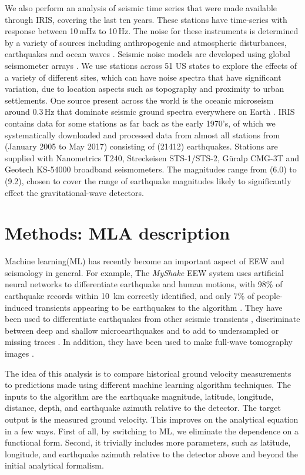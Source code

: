 \documentclass[reprint, prl, aps, showpacs]{revtex4-1}
\newcommand{\rednote}[1]{{\color{red} (#1)}}
\begin{document}
We also perform an analysis of seismic time series that were made available through IRIS, covering the last ten years. These stations have time-series with response between 10\,mHz to 10\,Hz. The noise for these instruments is determined by a variety of sources including anthropogenic and atmospheric disturbances, earthquakes and ocean waves \cite{BCB2006}. 
Seismic noise models are developed using global seismometer arrays  \cite{Pet1993,BDE2004,McEA2009}.
We use stations across 51 US states to explore the effects of a variety of different sites, which can have noise spectra that have significant variation, due to location aspects such as topography and proximity to urban settlements.
One source present across the world is the oceanic microseism around 0.3\,Hz that dominate seismic ground spectra everywhere on Earth \cite{HMS1963,ToLa1968,Ces1994,FKK1998}. IRIS contains data for some stations as far back as the early 1970's, of which we systematically downloaded and processed data from almost all stations from \rednote{January 2005 to May 2017} consisting of  \rednote{21412} earthquakes. Stations are supplied with Nanometrics T240, Streckeisen STS-1/STS-2, G\"uralp CMG-3T and Geotech KS-54000 broadband seismometers. 
The magnitudes range from \rednote{6.0} to \rednote{9.2}, chosen to cover the range of earthquake magnitudes likely to significantly effect the gravitational-wave detectors.





\section{Methods: MLA description} \label{sec:MLA}

Machine learning(ML) has recently become an important aspect of EEW and seismology in general. For example,
The \emph{MyShake} EEW system uses artificial neural networks to differentiate earthquake and human motions, with 98\% of earthquake records within 10\, km correctly identified, and only 7\% of people-induced transients appearing to be earthquakes to the algorithm  \cite{KoAl2016}.
They have been used to differentiate earthquakes from other seismic transients \cite{KuYi2011,KoUs2016,PeGh2017}, discriminate between deep and shallow microearthquakes \cite{MoHo2016} and to add to undersampled or missing traces \cite{JiMa2017}. In addition, they have been used to make full-wave tomography images \cite{DiLe2011}.

The idea of this analysis is to compare historical ground velocity measurements to predictions made using different machine learning algorithm techniques. 
The inputs to the algorithm are the earthquake magnitude, latitude, longitude, distance, depth, and earthquake azimuth relative to the detector. 
The target output is the measured ground velocity.
This improves on the analytical equation in a few ways.
First of all, by switching to ML, we eliminate the dependence on a functional form.
Second, it trivially includes more parameters, such as latitude, longitude, and earthquake azimuth relative to the detector above and beyond the initial analytical formalism. 
\end{document}
